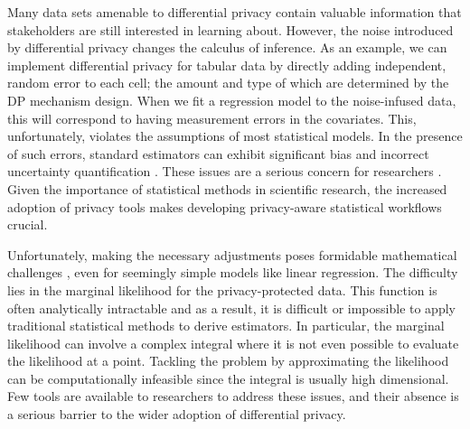Many data sets amenable to differential privacy contain
valuable information that stakeholders are still interested in
learning about. However, the noise introduced by differential privacy
changes the calculus of inference. As an example,
we can implement differential privacy for tabular data by directly
adding independent, random error to each cell; the amount and type of which are determined by the DP mechanism design.
When we fit a regression model to the noise-infused data,
this will correspond to having measurement errors
in the covariates. This, unfortunately, violates the assumptions of most statistical models.
In the presence of such errors, standard estimators can exhibit significant bias and incorrect uncertainty quantification
\citep{Gong2022, karwa2015private, Wang2018}.
These issues are a serious concern for researchers \citep{SantosLozada2020, Kenny2021, Winkler2021}.
Given the importance of statistical methods in scientific research,
the increased adoption of privacy tools makes developing privacy-aware statistical workflows crucial.

Unfortunately, making the necessary adjustments poses formidable mathematical
challenges \citep{NIPS2010_sherry}, even for seemingly simple models like linear regression.
The difficulty lies in the marginal likelihood for the privacy-protected data.
This function is often analytically intractable and as a result,
it is difficult or impossible to apply traditional statistical methods
to derive estimators. In particular, the marginal likelihood can involve a complex
integral where it is not even possible to evaluate the likelihood
at a point. Tackling the problem by approximating the likelihood can be computationally
infeasible since the integral is usually high dimensional.
Few tools are available to researchers to address these issues,
and their absence is a serious barrier to the wider adoption
of differential privacy.

